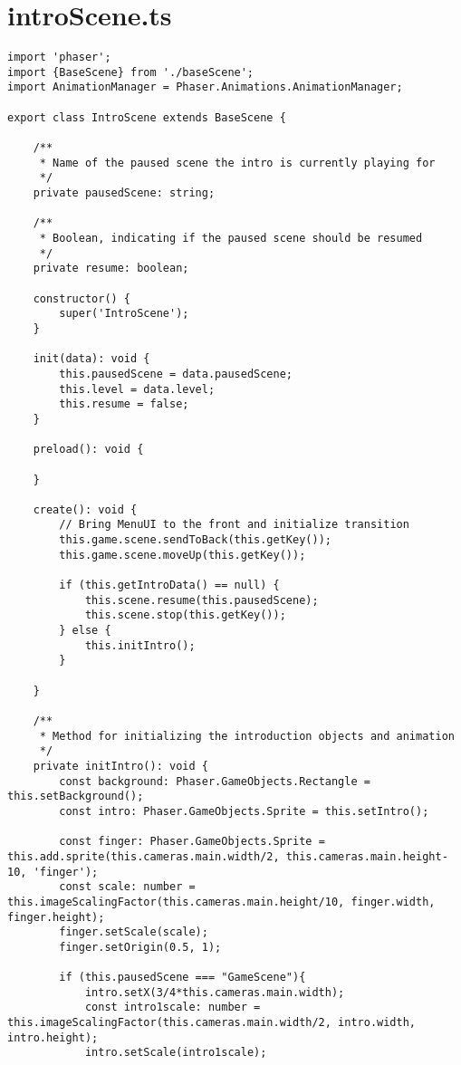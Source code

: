 \section{introScene.ts}\label{sec:introscene.ts}
\begin{lstlisting}[style=TypeScript, caption={introScene.ts}]
import 'phaser';
import {BaseScene} from './baseScene';
import AnimationManager = Phaser.Animations.AnimationManager;

export class IntroScene extends BaseScene {

    /**
     * Name of the paused scene the intro is currently playing for
     */
    private pausedScene: string;

    /**
     * Boolean, indicating if the paused scene should be resumed
     */
    private resume: boolean;

    constructor() {
        super('IntroScene');
    }

    init(data): void {
        this.pausedScene = data.pausedScene;
        this.level = data.level;
        this.resume = false;
    }

    preload(): void {

    }

    create(): void {
        // Bring MenuUI to the front and initialize transition
        this.game.scene.sendToBack(this.getKey());
        this.game.scene.moveUp(this.getKey());

        if (this.getIntroData() == null) {
            this.scene.resume(this.pausedScene);
            this.scene.stop(this.getKey());
        } else {
            this.initIntro();
        }

    }

    /**
     * Method for initializing the introduction objects and animation
     */
    private initIntro(): void {
        const background: Phaser.GameObjects.Rectangle = this.setBackground();
        const intro: Phaser.GameObjects.Sprite = this.setIntro();

        const finger: Phaser.GameObjects.Sprite = this.add.sprite(this.cameras.main.width/2, this.cameras.main.height-10, 'finger');
        const scale: number = this.imageScalingFactor(this.cameras.main.height/10, finger.width, finger.height);
        finger.setScale(scale);
        finger.setOrigin(0.5, 1);

        if (this.pausedScene === "GameScene"){
            intro.setX(3/4*this.cameras.main.width);
            const intro1scale: number = this.imageScalingFactor(this.cameras.main.width/2, intro.width, intro.height);
            intro.setScale(intro1scale);


\end{lstlisting}
